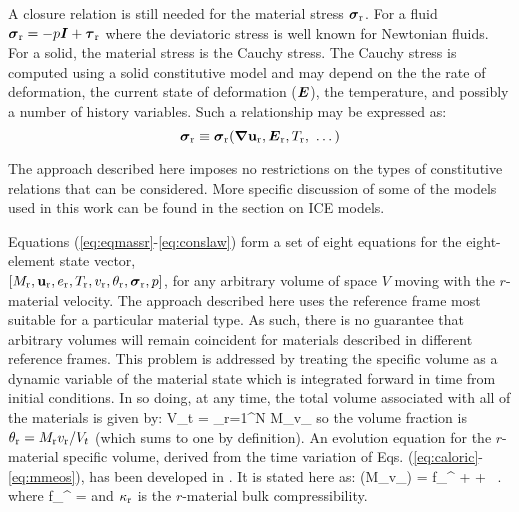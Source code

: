 A closure relation is still needed for the material stress $\boldsymbol{\sigma}_{\rm r}$.
For a fluid $\boldsymbol{\sigma}_{\rm r} = -p\boldsymbol{I} + \boldsymbol{\tau}_{\rm r}$ where the deviatoric stress
is well known for Newtonian fluids.  For a solid, the material stress is the
Cauchy stress.  The Cauchy stress is computed using a solid constitutive
model and may depend on the the rate of deformation, the current state of
deformation ($\boldsymbol{E}$), the temperature, and possibly a number of history
variables.  Such a relationship may be expressed as:
\begin{equation}
\boldsymbol{\sigma}_{\rm r} \equiv \boldsymbol{\sigma}_{\rm r}(\boldsymbol{\nabla} \mathbf{u}_{\rm r}, \boldsymbol{E}_{\rm r}, T_{\rm r},~ \dots)
\label{eq:conslaw}
\end{equation}

The approach described here imposes no restrictions on the types of constitutive relations
that can be considered.  More specific discussion of some of the models
used in this work can be found in the section on ICE models.

Equations (\ref{eq:eqmassr}-\ref{eq:conslaw}) form a set of eight equations for
the eight-element state vector, \\ $[M_{\rm r}, \mathbf{u}_{\rm r}, e_{\rm r}, T_{\rm r},
v_{\rm r}, \theta_{\rm r}, \boldsymbol{\sigma}_{\rm r}, p]$, for any arbitrary volume of space $V$
moving with the $r$-material velocity.  The approach described here uses the
reference frame most suitable for a particular material type.  As such,
there is no guarantee that arbitrary volumes will remain coincident for
materials described in different reference frames.  This problem is addressed
by treating the specific volume as a dynamic variable of the material state
which is integrated forward in time from initial conditions.  In so doing,
at any time, the total volume associated with all of the materials is given by:
\Beq
V_t = \sum_{r=1}^N M_\rmr v_\rmr
\Eeq
so the volume fraction is $\theta_{\rm r} = M_{\rm r} v_{\rm r} / V_t$ (which sums
to one by definition).  An evolution equation for the $r$-material specific
volume, derived from the time variation of Eqs. (\ref{eq:caloric}-\ref{eq:mmeos}),
has been developed in \cite{Kashiwa2000}.  It is stated here as:
%
\Beq
{}  (M_\rmr v_\rmr) =
  f_\rmr^{\theta} \Div{\Bu} +
  \left[v_\rmr \Gamma_\rmr -
  f_\rmr^{\theta} \sum_{i=1}^N
  v_\rms \Gamma_\rms \right]  +
  \left[\theta_\rmr
  \beta_\rmr \frac{D_\rmr T_\rmr}{Dt} -
  f_\rmr^{\theta} \sum_{i=1}^N
  \theta_\rms \beta_\rms \frac{D_\rms T_\rms}{Dt} \right] \, .
\label{eq:eqspvolr}
\Eeq
where 
\Beq
  f_\rmr^{\theta} = 
\Eeq
and $\kappa_{\rm r}$ is the $r$-material bulk compressibility.

